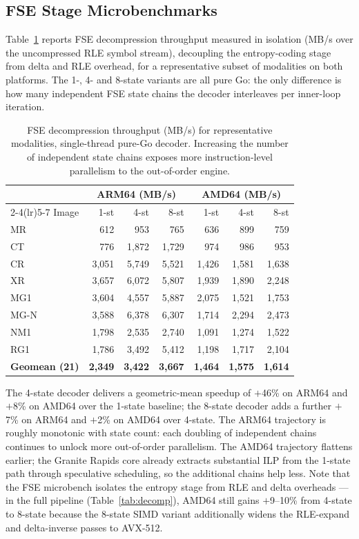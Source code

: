 \documentclass[journal]{IEEEtran}
\begin{document}
\subsection{FSE Stage Microbenchmarks}

Table~\ref{tab:fse-combined} reports FSE decompression throughput measured in
isolation (MB/s over the uncompressed RLE symbol stream), decoupling the
entropy-coding stage from delta and RLE overhead, for a representative subset
of modalities on both platforms. The 1-, 4- and 8-state variants are all
pure Go: the only difference is how many independent FSE state chains the
decoder interleaves per inner-loop iteration.

\begin{table}[htbp]
\centering
\caption{FSE decompression throughput (MB/s) for representative modalities,
single-thread pure-Go decoder. Increasing the number of independent state
chains exposes more instruction-level parallelism to the out-of-order
engine.}
\label{tab:fse-combined}
\scriptsize
\setlength{\tabcolsep}{4pt}
\begin{tabular}{lrrrrrr}
\toprule
 & \multicolumn{3}{c}{ARM64 (MB/s)} & \multicolumn{3}{c}{AMD64 (MB/s)} \\
\cmidrule(lr){2-4}\cmidrule(lr){5-7}
Image & 1-st & 4-st & 8-st & 1-st & 4-st & 8-st \\
\midrule
MR   &   612 &   953 &   765 &   636 &   899 &   759 \\
CT   &   776 & 1,872 & 1,729 &   974 &   986 &   953 \\
CR   & 3,051 & 5,749 & 5,521 & 1,426 & 1,581 & 1,638 \\
XR   & 3,657 & 6,072 & 5,807 & 1,939 & 1,890 & 2,248 \\
MG1  & 3,604 & 4,557 & 5,887 & 2,075 & 1,521 & 1,753 \\
MG-N & 3,588 & 6,378 & 6,307 & 1,714 & 2,294 & 2,473 \\
NM1  & 1,798 & 2,535 & 2,740 & 1,091 & 1,274 & 1,522 \\
RG1  & 1,786 & 3,492 & 5,412 & 1,198 & 1,717 & 2,104 \\
\midrule
\textbf{Geomean (21)} & \textbf{2,349} & \textbf{3,422} & \textbf{3,667} &
\textbf{1,464} & \textbf{1,575} & \textbf{1,614} \\
\bottomrule
\end{tabular}
\end{table}

The 4-state decoder delivers a geometric-mean speedup of $+$46\% on
ARM64 and $+$8\% on AMD64 over the 1-state baseline; the 8-state
decoder adds a further $+$7\% on ARM64 and $+$2\% on AMD64 over
4-state. The ARM64 trajectory is roughly monotonic with state count:
each doubling of independent chains continues to unlock more
out-of-order parallelism. The AMD64 trajectory flattens earlier; the
Granite Rapids core already extracts substantial ILP from the 1-state
path through speculative scheduling, so the additional chains help
less. Note that the FSE microbench isolates the entropy stage from RLE
and delta overheads --- in the full pipeline
(Table~\ref{tab:decomp}), AMD64 still gains $+$9--10\% from 4-state
to 8-state because the 8-state SIMD variant additionally widens the
RLE-expand and delta-inverse passes to AVX-512.
\end{document}
